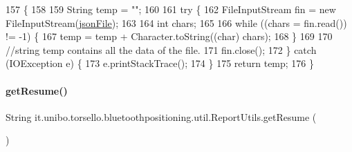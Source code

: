 \begin{DoxyCode}
157                             \{
158 
159         String temp = \textcolor{stringliteral}{""};
160 
161         \textcolor{keywordflow}{try} \{
162             FileInputStream fin = \textcolor{keyword}{new} FileInputStream(\hyperlink{classit_1_1unibo_1_1torsello_1_1bluetoothpositioning_1_1util_1_1ReportUtils_a3d54acab8d9785425b61d7a294444f85_a3d54acab8d9785425b61d7a294444f85}{jsonFile});
163 
164             \textcolor{keywordtype}{int} chars;
165 
166             \textcolor{keywordflow}{while} ((chars = fin.read()) != -1) \{
167                 temp = temp + Character.toString((\textcolor{keywordtype}{char}) chars);
168             \}
169 
170             \textcolor{comment}{//string temp contains all the data of the file.}
171             fin.close();
172         \} \textcolor{keywordflow}{catch} (IOException e) \{
173             e.printStackTrace();
174         \}
175         \textcolor{keywordflow}{return} temp;
176     \}
\end{DoxyCode}
\hypertarget{classit_1_1unibo_1_1torsello_1_1bluetoothpositioning_1_1util_1_1ReportUtils_a2b62843f2c0da4743686ca60edfc3aed_a2b62843f2c0da4743686ca60edfc3aed}{}\label{classit_1_1unibo_1_1torsello_1_1bluetoothpositioning_1_1util_1_1ReportUtils_a2b62843f2c0da4743686ca60edfc3aed_a2b62843f2c0da4743686ca60edfc3aed} 
\paragraph{\texorpdfstring{get\+Resume()}{getResume()}}
{\footnotesize\ttfamily String it.\+unibo.\+torsello.\+bluetoothpositioning.\+util.\+Report\+Utils.\+get\+Resume (\begin{DoxyParamCaption}{ }\end{DoxyParamCaption})}


